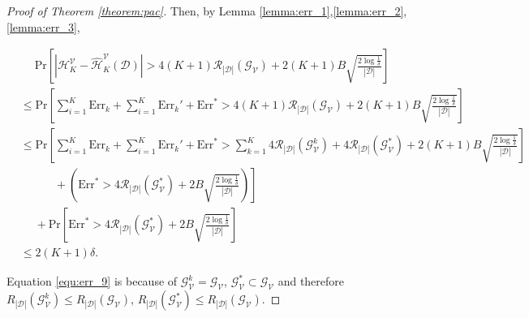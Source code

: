 \begin{proof}[Proof of Theorem \ref{theorem:pac}]
Then, by Lemma \ref{lemma:err_1},\ref{lemma:err_2},\ref{lemma:err_3}, 
\begin{small}
\begin{align}
    &\quad\; \mathrm{Pr}\left[|\mathcal H_K^\mathcal V - \hat{\mathcal H}_K^\mathcal V(\mathcal D)| > 4(K+1)\mathscr R_{|\mathcal D|}(\mathcal G_{\mathcal V}) + 2(K+1)B\sqrt{\frac{2\log{\frac{1}{\delta}}}{|\mathcal D|}}\right] \\
    &\leq \mathrm{Pr}\left[\sum_{i=1}^K \mathrm {Err}_k + \sum_{i=1}^K \mathrm {Err}_k' + \mathrm {Err}^* > 4(K+1)\mathscr R_{|\mathcal D|}(\mathcal G_{\mathcal V}) + 2(K+1)B\sqrt{\frac{2\log{\frac{1}{\delta}}}{|\mathcal D|}}\right] \\
    \label{equ:err_9}
    &\leq  \mathrm{Pr}\left[\sum_{i=1}^K \mathrm {Err}_k + \sum_{i=1}^K \mathrm {Err}_k' + \mathrm {Err}^* > \sum_{k=1}^K 4\mathscr R_{|\mathcal D|}(\mathcal G_{\mathcal V}^k) + 4\mathscr R_{|\mathcal D|}(\mathcal G_{\mathcal V}^*) + 2(K+1)B\sqrt{\frac{2\log{\frac{1}{\delta}}}{|\mathcal D|}}\right] \\
    &\left. \quad\quad\quad + \left(\mathrm{Err}^* > 4\mathscr R_{|\mathcal D|}(\mathcal G_{\mathcal V}^*) + 2B\sqrt{\frac{2\log{\frac{1}{\delta}}}{|\mathcal D|}} \right) \right] \\
    &\quad\; + \mathrm{Pr}\left[ \mathrm{Err}^* > 4\mathscr R_{|\mathcal D|}(\mathcal G_{\mathcal V}^*) + 2B\sqrt{\frac{2\log{\frac{1}{\delta}}}{|\mathcal D|}}  \right] \\
    &\leq 2(K+1)\delta.
\end{align}
\end{small}
Equation \ref{equ:err_9} is because of $\mathcal G_{\mathcal V}^k = \mathcal G_{\mathcal V}$, $\mathcal G_{\mathcal V}^* \subset \mathcal G_{\mathcal V}$ and therefore $R_{|\mathcal D|}(\mathcal G_{\mathcal V}^k) \leq R_{|\mathcal D|}(\mathcal G_{\mathcal V})$, $R_{|\mathcal D|}(\mathcal G_{\mathcal V}^*) \leq R_{|\mathcal D|}(\mathcal G_{\mathcal V})$.

\end{proof}
